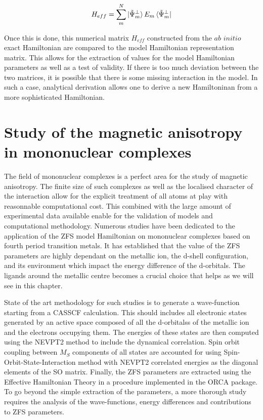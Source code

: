 \documentclass[10pt]{report}
\numberwithin{equation}{section}
\begin{document}
\begin{equation}
    H_{eff}=\sum_{m}^{N}\ket{\tilde{\Psi}_m^{\bot}}E_m \bra{\tilde{\Psi}_m^{\bot}}
\end{equation}

Once this is done, this numerical matrix $H_{eff}$ constructed from the $\textit{ab}$ $\textit{initio}$ exact Hamiltonian are compared to the model Hamiltonian representation matrix. 
This allows for the extraction of values for the model Hamiltonian parameters as well as a test of validity.
If there is too much deviation between the two matrices, it is possible that there is some missing interaction in the model.
In such a case, analytical derivation allows one to derive a new Hamiltoninan from a more sophisticated Hamiltonian.

\chapter{Study of the magnetic anisotropy in mononuclear complexes}

The field of mononuclear complexes is a perfect area for the study of magnetic anisotropy. 
The finite size of such complexes as well as the localised character of the interaction allow for the explicit treatment of all atoms at play with reasonnable computational cost.
This combined with the large amount of experimental data available enable for the validation of models and computational methodology.
Numerous studies have been dedicated to the application of the ZFS model Hamiltonian on mononuclear complexes based on fourth period transition metals.
It has established that the value of the ZFS parameters are highly dependant on the metallic ion, the d-shell configuration, and its environment which impact the energy difference of the d-orbitals.
The ligands around the metallic centre becomes a crucial choice that helps as we will see in this chapter.
\par State of the art methodology for such studies is to generate a wave-function starting from a CASSCF calculation. This should includes all electronic states generated by an active space composed of all the d-orbitalss of the metallic ion and the electrons occupying them. 
The energies of these states are then computed using the NEVPT2 method to include the dynamical correlation.
Spin orbit coupling between $M_S$ components of all states are accounted for using Spin-Orbit-State-Interaction method with NEVPT2 correlated energies as the diagonal elements of the SO matrix.
Finally, the ZFS parameters are extracted using the Effective Hamiltonian Theory in a procedure implemented in the ORCA package.
To go beyond the simple extraction of the parameters, a more thorough study requires the analysis of the wave-functions, energy differences and contributions to ZFS parameters.
\end{document}
